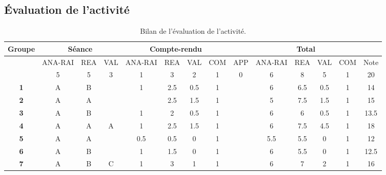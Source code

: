 \documentclass[12pt,a4paper, fleqn]{report}
\newcommand{\app}{\colorbox{bleu_c}{\textcolor{bleu_f}{APP}}}
\newcommand{\rea}{\colorbox{yellow_c}{\textcolor{yellow_f}{REA}}}
\newcommand{\anarai}{\colorbox{green_c}{\textcolor{green_f}{ANA-RAI}}}
\newcommand{\val}{\colorbox{orange_c}{\textcolor{orange_f}{VAL}}}
\newcommand{\com}{\colorbox{red_c}{\textcolor{red_f}{COM}}}
\begin{document}
\begin{landscape}



\chapter{Évaluation de l'activité}
\label{ann:eval}
\vfill
\begin{table}[h]
\renewcommand\arraystretch{1.5}		%
\begin{center}
\begin{tabular}{|c|c|c|c|c|c|c|c|c|c|c|c|c|c|}
\hline
\textbf{Groupe} & \multicolumn{3}{c|}{\textbf{Séance}} & \multicolumn{4}{c|}{\textbf{Compte-rendu}} & \multicolumn{6}{c|}{\textbf{Total}} \\
\hline 
& \anarai & \rea & \val & \anarai & \rea &\val & \com & \app & \anarai & \rea & \val & \com & Note \\
\hline
& 5 & 5 & 3 & 1 & 3 & 2 & 1 & 0 & 6 & 8 & 5 & 1 & 20 \\
\hline\hline
\textbf{1} & A & B & & 1 & 2.5 & 0.5 & 1 & & 6 & 6.5 & 0.5 & 1 & 14 \\
\hline
\textbf{2} & A & A & & & 2.5 & 1.5 & 1 & & 5 & 7.5 & 1.5 & 1 & 15 \\
\hline
\textbf{3} & A & B & & 1 & 2 & 0.5 & 1 & & 6 & 6 & 0.5 & 1 & 13.5 \\
\hline
\textbf{4} & A & A & A & 1 & 2.5 & 1.5 & 1 & & 6 & 7.5 & 4.5 & 1 & 18 \\
\hline
\textbf{5} & A & A & & 0.5 & 0.5 & 0 & 1 & & 5.5 & 5.5 & 0 & 1 & 12 \\
\hline
\textbf{6} & A & B & & 1 & 1.5 & 0 & 1 & & 6 & 5.5 & 0 & 1 & 12.5  \\
\hline
\textbf{7} & A & B & C & 1 & 3 & 1 & 1 & & 6 & 7 & 2 & 1 & 16 \\
\hline
\end{tabular}
\end{center}
\caption{Bilan de l'évaluation de l'activité.}
\label{tab:eval}
\end{table}
\vfill
\end{landscape}
\end{document}
